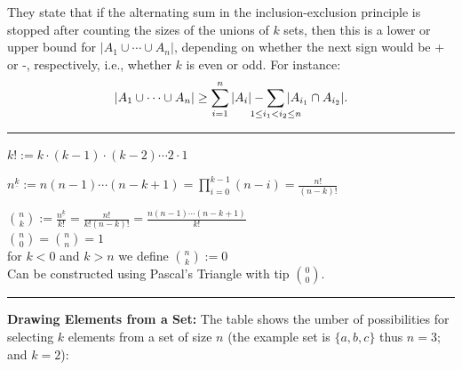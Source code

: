 \documentclass[a4paper]{extarticle}
\newcommand{\Com}{\textbf{Com.}\ }
\newcommand{\card}[1]{\lvert #1 \rvert}
\newcommand{\floor}[1]{\lfloor #1 \rfloor}
\newcommand{\sep}{\vspace{5pt}\noindent\hrule\vspace{5pt}}
\begin{document}
\begin{multicols*}{2}

 They state that if the
alternating sum in the inclusion-exclusion principle is stopped after counting
the sizes of the unions of $k$ sets, then this is a lower or upper bound for
$|A_1\cup\cdots\cup A_n|$, depending on whether the next sign would be + or
-, respectively, i.e., whether $k$ is even or odd. For instance:
\[
|A_1\cup\cdots\cup A_n| \geq \sum_{i=1}^{n}|A_i|
-\sum_{\mathclap{1\leq i_1 < i_2 \leq n}}|A_{i_{1}}\cap A_{i_{2}}|.
\]

\sep

\Def[Factorial] $k!:=k\cdot(k-1)\cdot(k-2)\cdots 2 \cdot 1$

\Def $n^{\underline{k}}
:=n(n-1)\cdots(n-k+1)=\prod_{i=0}^{k-1}(n-i)=\frac{n!}{(n-k)!}$

$\binom{n}{k}:=\frac{n^{\underline{k}}}{k!}=\frac{n!}{k!(n-k)!}=\frac{n(n-1)
\cdots(n-k+1)}{k!}$\\
$\binom{n}{0}=\binom{n}{n}=1$\\ 
for $k<0$ and $k>n$ we define $\binom{n}{k}:= 0$\\
Can be constructed using Pascal's Triangle with tip $\binom{0}{0}$.\\

\sep

\textbf{Drawing Elements from a Set:} The table shows the umber of possibilities
for selecting $k$ elements from a set of size $n$ (the example set is
$\{a,b,c\}$ thus $n=3$; and $k=2$):


\end{multicols*}
\end{document}
